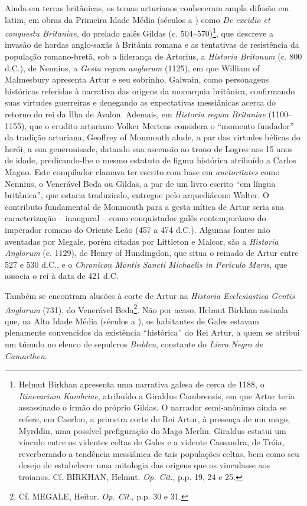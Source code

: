 Ainda em terras britânicas, os temas arturianos conheceram ampla difusão em
latim, em obras da Primeira Idade Média (séculos  a ) como \textit{De
excidio et conquestu Britaniae}, do prelado galês Gildas (c. 504--570)\footnote{
Helmut Birkhan apresenta uma narrativa galesa de cerca de 1188, o
\textit{Itinerarium Kambriae}, atribuído a Giraldus Cambrensis, em que Artur
teria assassinado o irmão do próprio Gildas. O narrador semi-anônimo ainda se
refere, em Caerlon, a primeira corte do Rei Artur, à presença de um mago,
Myrddin, uma possível prefiguração do Mago Merlin. Giraldus estatui um vínculo
entre os videntes celtas de Gales e a vidente Cassandra, de Tróia, reverberando
a tendência messiânica de tais populações celtas, bem como seu desejo de
estabelecer uma mitologia das origens que os vinculasse aos troianos. Cf.
BIRKHAN, Helmut. \textit{Op. Cit}., p.p. 19, 24 e 25. }, que descreve a invasão
de hordas anglo-saxãs à Britânia romana e as tentativas de resistência da
população romano-bretã, sob a liderança de Artorius, a \textit{Historia
Britonum} (c. 800 d.C.), de Nennius, a \textit{Gesta regum anglorum }(1125), em
que William of Malmesbury apresenta Artur e seu sobrinho, Galwain, como
personagens históricas referidas à narrativa das origens da monarquia
britânica, confirmando suas virtudes guerreiras e denegando as expectativas
messiânicas acerca do retorno do rei da Ilha de Avalon. Ademais, em
\textit{Historia regum Britaniae }(1100--1155), que o erudito arturiano Volker
Mertens considera o “momento fundador” da tradição arturiana, Geoffrey of
Monmouth alude, a par das virtudes bélicas do herói, a sua generonisade,
datando sua ascensão ao trono de Logres aos 15 anos de idade, predicando-lhe o
mesmo estatuto de figura histórica atribuído a Carlos Magno. Este compilador
clamava ter escrito com base em \textit{auctoritates} como Nennius, o Venerável
Beda ou Gildas, a par de um livro escrito “em língua britânica”, que estaria
traduzindo, entregue pelo arquediácono Walter. O contributo fundamental de
Monmouth para a gesta mítica de Artur seria sua caracterização -- inaugural --
como conquistador galês contemporâneo do imperador romano do Oriente Leão 
(457 a 474 d.C.). Algumas fontes não aventadas por Megale, porém citadas por
Littleton e Malcor, são a \textit{Historia Anglorum} (c. 1129), de Henry of
Hundingdon, que situa o reinado de Artur entre 527 e 530 d.C., e o
\textit{Chronicon Montis Sancti Michaelis in Periculo Maris}, que associa o rei
à data de 421 d.C. 

Também se encontram alusões à corte de Artur na \textit{Historia Ecclesiastica
Gentis Anglorum }(731), do Venerável Beda\footnote{ Cf. MEGALE, Heitor.
\textit{Op. Cit}., p.p. 30 e 31. }. Não por acaso, Helmut Birkhan assinala que,
na Alta Idade Média (séculos  a ), os habitantes de Gales estavam
plenamente convencidos da existência “histórica” do Rei Artur, a quem se
atribui um túmulo no elenco de sepulcros \textit{Beddeu}, constante do
\textit{Livro Negro de Camarthen}. 

